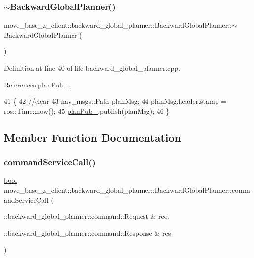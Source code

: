 \subsubsection{\texorpdfstring{$\sim$\+Backward\+Global\+Planner()}{~BackwardGlobalPlanner()}}
{\footnotesize\ttfamily move\+\_\+base\+\_\+z\+\_\+client\+::backward\+\_\+global\+\_\+planner\+::\+Backward\+Global\+Planner\+::$\sim$\+Backward\+Global\+Planner (\begin{DoxyParamCaption}{ }\end{DoxyParamCaption})\hspace{0.3cm}{\ttfamily [virtual]}}



Definition at line 40 of file backward\+\_\+global\+\_\+planner.\+cpp.



References plan\+Pub\+\_\+.


\begin{DoxyCode}
41 \{
42     \textcolor{comment}{//clear}
43     nav\_msgs::Path planMsg;
44     planMsg.header.stamp = ros::Time::now();
45     \hyperlink{classmove__base__z__client_1_1backward__global__planner_1_1BackwardGlobalPlanner_ab074d9ac8ea790d7f5275ee27dae940c}{planPub\_}.publish(planMsg);
46 \}
\end{DoxyCode}


\subsection{Member Function Documentation}
\mbox{\label{classmove__base__z__client_1_1backward__global__planner_1_1BackwardGlobalPlanner_a089a3f34a80d7c6540bdf771eaf409f5}} 
\subsubsection{\texorpdfstring{command\+Service\+Call()}{commandServiceCall()}}
{\footnotesize\ttfamily \hyperlink{classbool}{bool} move\+\_\+base\+\_\+z\+\_\+client\+::backward\+\_\+global\+\_\+planner\+::\+Backward\+Global\+Planner\+::command\+Service\+Call (\begin{DoxyParamCaption}\item[{\+::backward\+\_\+global\+\_\+planner\+::command\+::\+Request \&}]{req,  }\item[{\+::backward\+\_\+global\+\_\+planner\+::command\+::\+Response \&}]{res }\end{DoxyParamCaption})\hspace{0.3cm}{\ttfamily [private]}}


